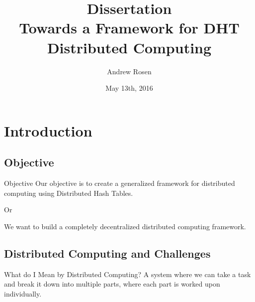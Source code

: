 \documentclass[11pt]{beamer}
\author{Andrew Rosen}
\title[Autonomous Load-Balancing]{Dissertation \\ Towards a Framework for DHT Distributed Computing}
\institute{Georgia State University}
\date{May 13th, 2016}
\begin{document}
	
	
	
\maketitle


\section{Introduction}


\subsection{Objective}
\begin{frame}{Objective}
Our objective is to create a generalized framework for distributed computing using Distributed Hash Tables.

\pause
\begin{center}
	Or
\end{center}

\pause
We want to build a completely decentralized distributed computing framework.
\end{frame}


\subsection{Distributed Computing and Challenges}

\begin{frame}{What do I Mean by Distributed Computing?}
	A system where we can take a task and break it down into multiple parts, where each part is worked upon individually.
\end{frame}

\end{document}
